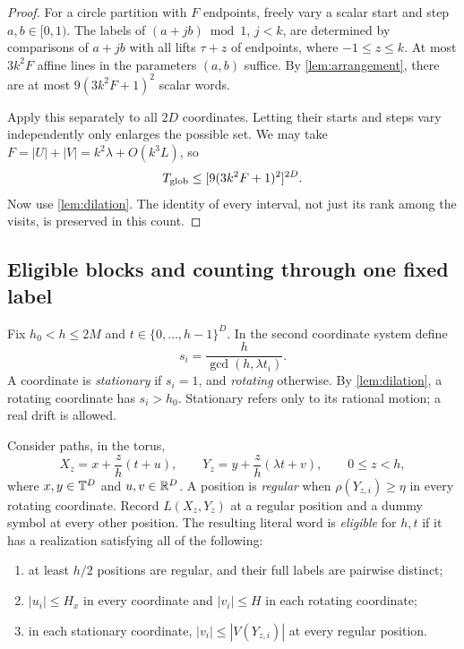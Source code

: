 \begin{proof}
For a circle partition with \(F\) endpoints, freely vary a scalar
start and step \(a,b\in[0,1)\). The labels of
\((a+jb)\bmod1\), \(j<k\), are determined by comparisons of \(a+jb\)
with all lifts \(\tau+z\) of endpoints, where \(-1\le z\le k\).
At most \(3k^2F\) affine lines in the parameters \((a,b)\) suffice.
By \cref{lem:arrangement}, there are at most
\(9(3k^2F+1)^2\) scalar words.

Apply this separately to all \(2D\) coordinates. Letting their starts
and steps vary independently only enlarges the possible set.
We may take \(F=|U|+|V|=k^2\lambda+O(k^3L)\), so
\[
 T_{\rm glob}\le[9(3k^2F+1)^2]^{2D}.
\]
Now use \cref{lem:dilation}. The identity of every interval, not just
its rank among the visits, is preserved in this count.
\end{proof}

\subsection{Eligible blocks and counting through one fixed label}

Fix \(h_0<h\le2M\) and \(t\in\{0,\ldots,h-1\}^D\).
In the second coordinate system define
\[
 s_i=\frac{h}{\gcd(h,\lambda t_i)}.
\]
A coordinate is \emph{stationary} if \(s_i=1\), and \emph{rotating}
otherwise. By \cref{lem:dilation}, a rotating coordinate has \(s_i>h_0\).
Stationary refers only to its rational motion; a real drift is allowed.

\begin{definition}\label{def:eligible}
Consider paths, in the torus,
\[
 X_z=x+\frac zh(t+u),\qquad
 Y_z=y+\frac zh(\lambda t+v),\qquad 0\le z<h,
\]
where \(x,y\in\mathbb T^D\) and \(u,v\in\mathbb R^D\).
A position is \emph{regular} when
\(\rho(Y_{z,i})\ge\eta\) in every rotating coordinate.
Record \(L(X_z,Y_z)\) at a regular position and a dummy symbol at
every other position.
The resulting literal word is \emph{eligible} for \(h,t\) if it has
a realization satisfying all of the following:
\begin{enumerate}
 \item at least \(h/2\) positions are regular, and their full labels
       are pairwise distinct;
 \item \(|u_i|\le H_x\) in every coordinate and \(|v_i|\le H\)
       in each rotating coordinate;
 \item in each stationary coordinate,
       \(|v_i|\le |V(Y_{z,i})|\) at every regular position.
\end{enumerate}
\end{definition}

